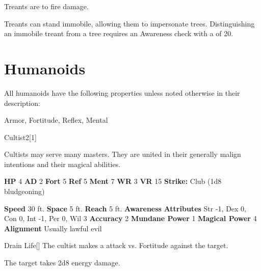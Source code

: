         Treants are  to fire damage.
      
        Treants can stand immobile, allowing them to impersonate trees.
        Distinguishing an immobile treant from a tree requires an Awareness check with a  of 20.
  
  
        \section{Humanoids}

        All humanoids have the following properties unless noted otherwise in their description:
        
    
     Armor,
     Fortitude,
     Reflex,
     Mental
  
  
      
  \begin{monsection}{Cultist}{2}[1]
    \vspace{-1em}\vspace{-1em}
    \vspace{0em}

    
      Cultists may serve many masters.
      They are united in their generally malign intentions and their magical abilities.
    
    

    \begin{spellcontent}
      \begin{spelltargetinginfo}
        \pari \textbf{HP} 4 \monsep
          \textbf{AD} 2 \monsep
          \textbf{Fort} 5 \monsep
          \textbf{Ref} 5 \monsep
          \textbf{Ment} 7
        \pari \textbf{WR} 3 \monsep
        \textbf{VR} 15
        \pari \textbf{Strike:}
            Club  (1d8 bludgeoning)
      \end{spelltargetinginfo}
    \end{spellcontent}
    \begin{monsterfooter}
      \pari \textbf{Speed} 30 ft. \monsep
        \textbf{Space} 5 ft. \monsep
        \textbf{Reach} 5 ft.
      \pari \textbf{Awareness} 
      \pari \textbf{Attributes}
        Str -1, Dex 0,
        Con 0, Int -1,
        Per 0, Wil 3
      \pari \textbf{Accuracy} 2 \monsep
        \textbf{Mundane Power} 1 \monsep
      \textbf{Magical Power} 4
      \pari \textbf{Alignment} Usually lawful evil
    \end{monsterfooter}
  \end{monsection}
  \begin{freeability}{Drain Life}[]
       The cultist makes a  attack
        vs. Fortitude against the target.
    
    \hit The target takes 2d8 energy damage.
    \end{freeability}
  
